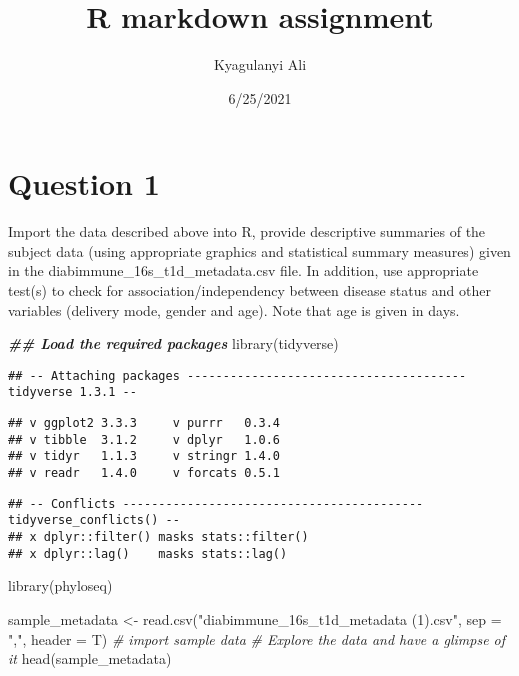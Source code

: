 \documentclass[
]{article}
\title{R markdown assignment}
\author{Kyagulanyi Ali}
\date{6/25/2021}
\newenvironment{Shaded}{\begin{snugshade}}{\end{snugshade}}
\newcommand{\AttributeTok}[1]{\textcolor[rgb]{0.77,0.63,0.00}{#1}}
\newcommand{\CommentTok}[1]{\textcolor[rgb]{0.56,0.35,0.01}{\textit{#1}}}
\newcommand{\DocumentationTok}[1]{\textcolor[rgb]{0.56,0.35,0.01}{\textbf{\textit{#1}}}}
\newcommand{\FunctionTok}[1]{\textcolor[rgb]{0.00,0.00,0.00}{#1}}
\newcommand{\NormalTok}[1]{#1}
\newcommand{\OtherTok}[1]{\textcolor[rgb]{0.56,0.35,0.01}{#1}}
\newcommand{\StringTok}[1]{\textcolor[rgb]{0.31,0.60,0.02}{#1}}
\begin{document}
\maketitle

\hypertarget{question-1}{%
\section{Question 1}\label{question-1}}

Import the data described above into R, provide descriptive summaries of
the subject data (using appropriate graphics and statistical summary
measures) given in the diabimmune\_16s\_t1d\_metadata.csv file. In
addition, use appropriate test(s) to check for association/independency
between disease status and other variables (delivery mode, gender and
age). Note that age is given in days.

\begin{Shaded}
\begin{Highlighting}[]
\DocumentationTok{\#\# Load the required packages}
\FunctionTok{library}\NormalTok{(tidyverse)}
\end{Highlighting}
\end{Shaded}

\begin{verbatim}
## -- Attaching packages --------------------------------------- tidyverse 1.3.1 --
\end{verbatim}

\begin{verbatim}
## v ggplot2 3.3.3     v purrr   0.3.4
## v tibble  3.1.2     v dplyr   1.0.6
## v tidyr   1.1.3     v stringr 1.4.0
## v readr   1.4.0     v forcats 0.5.1
\end{verbatim}

\begin{verbatim}
## -- Conflicts ------------------------------------------ tidyverse_conflicts() --
## x dplyr::filter() masks stats::filter()
## x dplyr::lag()    masks stats::lag()
\end{verbatim}

\begin{Shaded}
\begin{Highlighting}[]
\FunctionTok{library}\NormalTok{(phyloseq)}
\end{Highlighting}
\end{Shaded}

\begin{Shaded}
\begin{Highlighting}[]
\NormalTok{sample\_metadata }\OtherTok{\textless{}{-}} \FunctionTok{read.csv}\NormalTok{(}\StringTok{"diabimmune\_16s\_t1d\_metadata (1).csv"}\NormalTok{, }\AttributeTok{sep =} \StringTok{","}\NormalTok{, }\AttributeTok{header =}\NormalTok{ T) }\CommentTok{\# import sample data}
\CommentTok{\# Explore the data and have a glimpse of it}
\FunctionTok{head}\NormalTok{(sample\_metadata)}
\end{Highlighting}
\end{Shaded}
\end{document}
